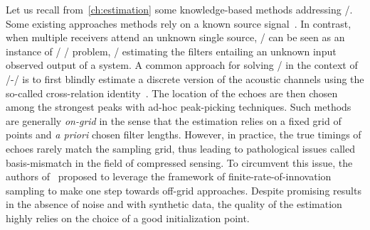 
Let us recall from~\cref{ch:estimation} some knowledge-based methods addressing \AER/.
Some existing approaches methods rely on a known source signal~.
In contrast, when multiple receivers attend an unknown single source, \AER/ can be seen as an instance of \SIMOdef/ \BCEdef/ problem, \ie/ estimating the filters entailing an unknown input observed output of a system.
A common approach for solving \AER/ in the context of \SIMO/-\BCE/ is to first blindly estimate a discrete version of the acoustic channels using the so-called cross-relation identity~.
The location of the echoes are then chosen among the strongest peaks with ad-hoc peak-picking techniques.
Such methods are generally \emph{on-grid} in the sense that the estimation relies on a fixed grid of points and \textit{a priori} chosen filter lengths.
However, in practice, the true timings of echoes rarely match the sampling grid, thus leading to pathological issues called basis-mismatch in the field of compressed sensing.
To circumvent this issue, the authors of~ proposed to leverage the framework of finite-rate-of-innovation sampling to make one step towards off-grid approaches.
Despite promising results in the absence of noise and with synthetic data, the quality of the estimation highly relies on the choice of a good initialization point.

